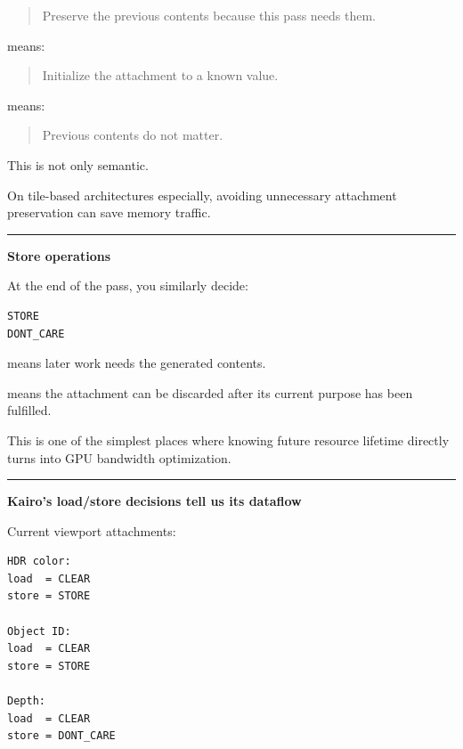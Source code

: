 \begin{quote}
Preserve the previous contents because this pass needs them.
\end{quote}

 means:

\begin{quote}
Initialize the attachment to a known value.
\end{quote}

 means:

\begin{quote}
Previous contents do not matter.
\end{quote}

This is not only semantic.

On tile-based architectures especially, avoiding unnecessary attachment preservation can save memory traffic.

\begin{center}\rule{0.5\linewidth}{0.5pt}\end{center}

\textbf{Store operations}

At the end of the pass, you similarly decide:

\begin{verbatim}
STORE
DONT_CARE
\end{verbatim}

 means later work needs the generated contents.

 means the attachment can be discarded after its current purpose has been fulfilled.

This is one of the simplest places where knowing future resource lifetime directly turns into GPU bandwidth optimization.

\begin{center}\rule{0.5\linewidth}{0.5pt}\end{center}

\textbf{Kairo's load/store decisions tell us its dataflow}

Current viewport attachments:

\begin{verbatim}
HDR color:
load  = CLEAR
store = STORE

Object ID:
load  = CLEAR
store = STORE

Depth:
load  = CLEAR
store = DONT_CARE
\end{verbatim}

